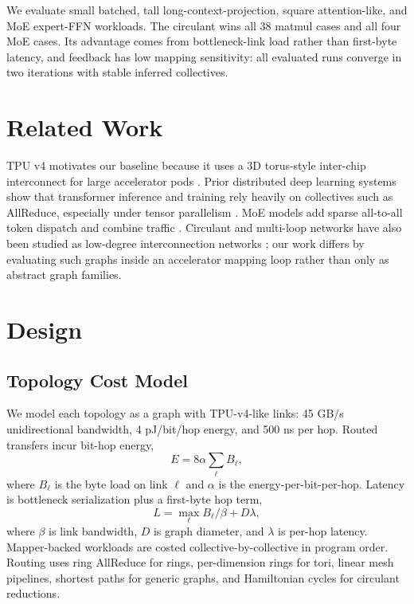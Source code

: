 \documentclass[conference]{IEEEtran}
\begin{document}
We evaluate small batched, tall long-context-projection, square attention-like,
and MoE expert-FFN workloads. The circulant wins all 38 matmul cases and all
four MoE cases. Its advantage comes from bottleneck-link load rather than
first-byte latency, and feedback has low mapping sensitivity: all evaluated
runs converge in two iterations with stable inferred collectives.


\section{Related Work}
TPU v4 motivates our baseline because it uses a 3D torus-style inter-chip
interconnect for large accelerator pods \cite{tpuv4}. Prior distributed deep
learning systems show that transformer inference and training rely heavily on
collectives such as AllReduce, especially under tensor parallelism
\cite{megatron}. MoE models add sparse all-to-all token dispatch and combine
traffic \cite{gshard,switch}. Circulant and multi-loop networks have also been
studied as low-degree interconnection networks \cite{circulant_survey}; our
work differs by evaluating such graphs inside an accelerator mapping loop
rather than only as abstract graph families.

\section{Design}
\subsection{Topology Cost Model}
We model each topology as a graph with TPU-v4-like links: 45 GB/s
unidirectional bandwidth, 4 pJ/bit/hop energy, and 500 ns per hop. Routed
transfers incur bit-hop energy,
\begin{equation}
E = 8 \alpha \sum_{\ell} B_{\ell},
\end{equation}
where $B_{\ell}$ is the byte load on link $\ell$ and $\alpha$ is the
energy-per-bit-per-hop. Latency is bottleneck serialization plus a first-byte
hop term,
\begin{equation}
L = \max_{\ell} B_{\ell}/\beta + D\lambda,
\end{equation}
where $\beta$ is link bandwidth, $D$ is graph diameter, and $\lambda$ is
per-hop latency. Mapper-backed workloads are costed collective-by-collective in
program order. Routing uses ring AllReduce for rings, per-dimension rings for
tori, linear mesh pipelines, shortest paths for generic graphs, and Hamiltonian
cycles for circulant reductions.
\end{document}
